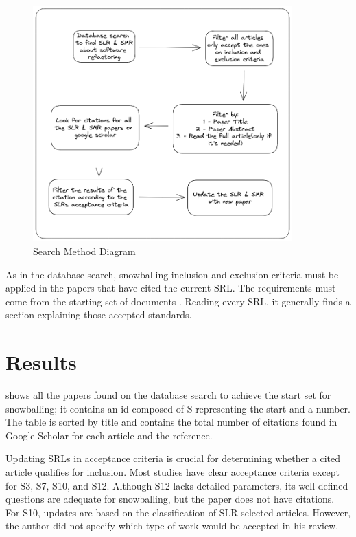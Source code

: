 \begin{figure}[ht!]
\SetCaptionWidth{\textwidth}
\caption{Search Method Diagram}
\label{fig-snow}
\includegraphics[width =100mm]{Chapter-3/Figures/snowballing_diagram.png}
\end{figure}
\FloatBarrier

As in the database search, snowballing inclusion and exclusion criteria must be applied in the papers that have cited the current SRL. The requirements must come from the starting set of documents \cite{Wohlin2020}. Reading every SRL, it generally finds a section explaining those accepted standards.


\section{Results}
\label{sec-results}
 shows all the papers found on the database search to achieve the start set for snowballing; it contains an id composed of S representing the start and a number. The table is sorted by title and contains the total number of citations found in Google Scholar for each article and the reference.



Updating SRLs in acceptance criteria is crucial for determining whether a cited article qualifies for inclusion. Most studies have clear acceptance criteria except for S3, S7, S10, and S12. Although S12 lacks detailed parameters, its well-defined questions are adequate for snowballing, but the paper does not have citations. For S10, updates are based on the classification of SLR-selected articles. However, the author did not specify which type of work would be accepted in his review.

